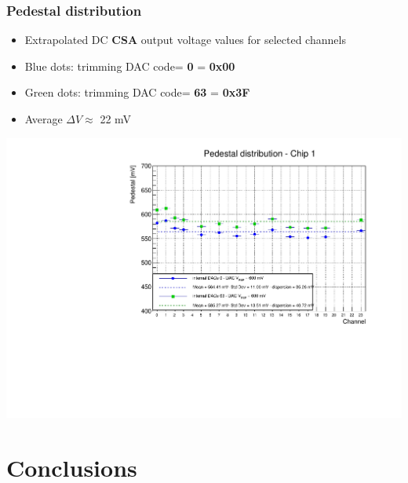 \documentclass[aspectratio=169]{beamer}
\begin{document}

	\begin{frame}
	\frametitle{Pedestal distribution}
	\begin{itemize}
		\item Extrapolated DC \textbf{CSA} output voltage values for selected channels
		\item {\color{blue}Blue} dots: trimming DAC code= \textbf{0} = \textbf{0x00}
		\item {\color{green}Green} dots: trimming DAC code= \textbf{63} = \textbf{0x3F}
		\item Average $\Delta V\approx$ 22 mV
	\end{itemize}
	\begin{center}
		\includegraphics[width=0.55 \textwidth]{data/DAC_V_REF_600mV-Copia.pdf}
	\end{center}
	
\end{frame}

	\section{Conclusions}
	
\end{document}
